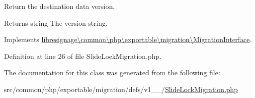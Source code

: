 Return the destination data version.

\begin{DoxyReturn}{Returns}
string The version string. 
\end{DoxyReturn}


Implements \hyperlink{interfacelibresignage_1_1common_1_1php_1_1exportable_1_1migration_1_1MigrationInterface_a9eddabf63771d4d1081bd6d067c7dff5}{libresignage\textbackslash{}common\textbackslash{}php\textbackslash{}exportable\textbackslash{}migration\textbackslash{}\+Migration\+Interface}.



Definition at line 26 of file Slide\+Lock\+Migration.\+php.



The documentation for this class was generated from the following file\+:\begin{DoxyCompactItemize}
\item 
src/common/php/exportable/migration/defs/v1\+\_\+\_/\hyperlink{v1__1__0_2SlideLockMigration_8php}{Slide\+Lock\+Migration.\+php}\end{DoxyCompactItemize}
